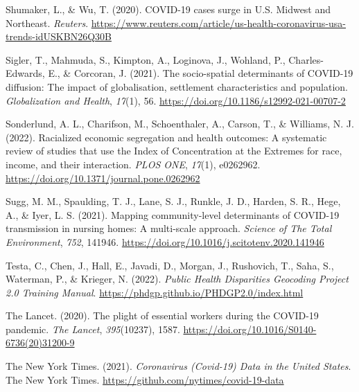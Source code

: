 \documentclass[
]{article}
\newlength{\cslhangindent}
\newlength{\cslentryspacingunit} %
\newenvironment{CSLReferences}[2] %
 {%
  \setlength{\parindent}{0pt}
  \ifodd #1
  \let\oldpar\par
  \def\par{\hangindent=\cslhangindent\oldpar}
  \fi
  \setlength{\parskip}{#2\cslentryspacingunit}
 }%
 {}
\begin{document}
\begin{CSLReferences}{1}{0}
\leavevmode{}%
Shumaker, L., \& Wu, T. (2020). {COVID}-19 cases surge in {U}.{S}. {Midwest} and {Northeast}. \emph{Reuters}. \url{https://www.reuters.com/article/us-health-coronavirus-usa-trends-idUSKBN26Q30B}

\leavevmode{}%
Sigler, T., Mahmuda, S., Kimpton, A., Loginova, J., Wohland, P., Charles-Edwards, E., \& Corcoran, J. (2021). The socio-spatial determinants of {COVID}-19 diffusion: The impact of globalisation, settlement characteristics and population. \emph{Globalization and Health}, \emph{17}(1), 56. \url{https://doi.org/10.1186/s12992-021-00707-2}

\leavevmode{}%
Sonderlund, A. L., Charifson, M., Schoenthaler, A., Carson, T., \& Williams, N. J. (2022). Racialized economic segregation and health outcomes: {A} systematic review of studies that use the {Index} of {Concentration} at the {Extremes} for race, income, and their interaction. \emph{PLOS ONE}, \emph{17}(1), e0262962. \url{https://doi.org/10.1371/journal.pone.0262962}

\leavevmode{}%
Sugg, M. M., Spaulding, T. J., Lane, S. J., Runkle, J. D., Harden, S. R., Hege, A., \& Iyer, L. S. (2021). Mapping community-level determinants of {COVID}-19 transmission in nursing homes: {A} multi-scale approach. \emph{Science of The Total Environment}, \emph{752}, 141946. \url{https://doi.org/10.1016/j.scitotenv.2020.141946}

\leavevmode{}%
Testa, C., Chen, J., Hall, E., Javadi, D., Morgan, J., Rushovich, T., Saha, S., Waterman, P., \& Krieger, N. (2022). \emph{Public {Health} {Disparities} {Geocoding} {Project} 2.0 {Training} {Manual}}. \url{https://phdgp.github.io/PHDGP2.0/index.html}

\leavevmode{}%
The Lancet. (2020). The plight of essential workers during the {COVID}-19 pandemic. \emph{The Lancet}, \emph{395}(10237), 1587. \url{https://doi.org/10.1016/S0140-6736(20)31200-9}

\leavevmode{}%
The New York Times. (2021). \emph{Coronavirus ({Covid}-19) {Data} in the {United} {States}}. The New York Times. \url{https://github.com/nytimes/covid-19-data}


\end{CSLReferences}
\end{document}
